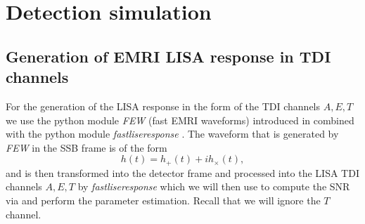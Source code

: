 \chapter{Detection simulation}\label{ch:detection-simulation}

\section{Generation of EMRI LISA response in TDI channels}\label{sec:generation-of-emri-lisa-response}
For the generation of the LISA response in the form of the TDI channels $A,E,T$ we use the python module \emph{FEW} (fast EMRI waveforms) \cite{Katz_2021,Chua_2021} introduced in  combined with the python module \emph{fastliseresponse} \cite{Katz_2022}. The waveform that is generated by \emph{FEW} in the SSB frame is of the form
\begin{equation}
    h(t) = h_+(t) + i h_\times(t),
\end{equation}
and is then transformed into the detector frame and processed into the LISA TDI channels $A,E,T$ by \emph{fastliseresponse} which we will then use to compute the SNR via  and perform the parameter estimation. Recall that we will ignore the $T$ channel.

